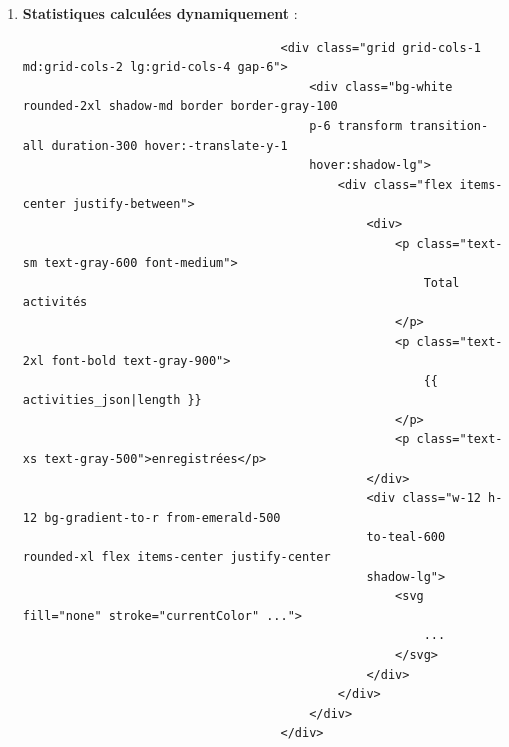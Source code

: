 \documentclass[a4paper,11pt]{article}
\begin{document}
\begin{enumerate}
                        \item \textbf{Statistiques calculées dynamiquement} :
                            \begin{tcolorbox}[colback=lightgray!5, colframe=gray!80, left=-70mm, right=5mm, top=2mm, bottom=0mm, boxrule=0.1mm]
                                \begin{verbatim}
                                    <div class="grid grid-cols-1 md:grid-cols-2 lg:grid-cols-4 gap-6">
                                        <div class="bg-white rounded-2xl shadow-md border border-gray-100 
                                        p-6 transform transition-all duration-300 hover:-translate-y-1 
                                        hover:shadow-lg">
                                            <div class="flex items-center justify-between">
                                                <div>
                                                    <p class="text-sm text-gray-600 font-medium">
                                                        Total activités
                                                    </p>
                                                    <p class="text-2xl font-bold text-gray-900">
                                                        {{ activities_json|length }}
                                                    </p>
                                                    <p class="text-xs text-gray-500">enregistrées</p>
                                                </div>
                                                <div class="w-12 h-12 bg-gradient-to-r from-emerald-500 
                                                to-teal-600 rounded-xl flex items-center justify-center 
                                                shadow-lg">
                                                    <svg fill="none" stroke="currentColor" ...">
                                                        ...
                                                    </svg>
                                                </div>
                                            </div>
                                        </div>
                                    </div>
                                \end{verbatim}
                            \end{tcolorbox}


\end{enumerate}
\end{document}
